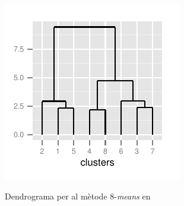 \documentclass[
	a4paper,
	twoside,
	justified
]{tufte-book}
\begin{document}
\begin{marginfigure}
\begin{center}
\includegraphics{presence_complete_dendrogram_8means_clusts}
\caption{
\label{graph:presence_complete_dendrogram_8means_clusts}
	Dendrograma per al mètode 8-\emph{means} en  
}
\end{center}
\end{marginfigure}
\end{document}
